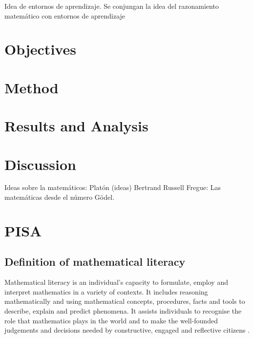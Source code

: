 \documentclass[a4paper, 10pt]{article}
\begin{document}
Idea de entornos de aprendizaje. Se conjungan la idea del razonamiento matemático con entornos de aprendizaje

\section{Objectives}

\section{Method}

\section{Results and Analysis}

\section{Discussion}

Ideas sobre la matemáticos:
Platón (ideas)
Bertrand Russell
Fregue: Las matemáticas desde el número
Gödel.


%


\section{PISA}
\subsection{Definition of mathematical literacy}
Mathematical  literacy  is  an  individual’s  capacity  to  formulate,  employ  and  interpret  mathematics  in  a  variety of  contexts.  It  includes  reasoning  mathematically  and  using  mathematical  concepts,  procedures,  facts  and  tools
to  describe, explain and predict phenomena. It assists individuals to recognise the role that mathematics plays in the world  and  to  make  the  well-founded  judgements  and  decisions  needed  by  constructive,  engaged  and  reflective  citizens \cite{oecd2015framework}.
\end{document}
